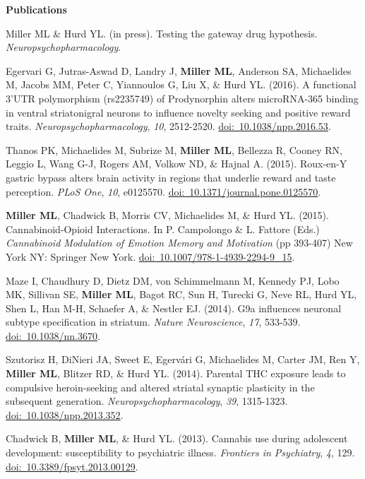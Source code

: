\documentclass[10pt, singleside]{article}
\begin{document}
{\large \textbf{Publications}}

\begin{description}
\item Miller ML \& Hurd YL. (in press). Testing the gateway drug hypothesis. \textit{Neuropsychopharmacology}.
\item Egervari G, Jutras-Aswad D, Landry J, \textbf{Miller ML}, Anderson SA, Michaelides M, Jacobs MM, Peter C, Yiannoulos G, Liu X, \& Hurd YL. (2016). A functional 3'UTR polymorphism (rs2235749) of Prodynorphin alters microRNA-365 binding in ventral striatonigral neurons to influence novelty seeking and positive reward traits. \textit{Neuropsychopharmacology}, \textit{10}, 2512-2520. \href{http://dx.doi.org/10.1038/npp.2016.53}{doi:~10.1038/npp.2016.53}.
\item Thanos PK, Michaelides M, Subrize M, \textbf{Miller ML}, Bellezza R, Cooney RN, Leggio L, Wang G-J, Rogers AM, Volkow ND, \& Hajnal A. (2015). Roux-en-Y gastric bypass alters brain activity in regions that underlie reward and taste perception. \textit{PLoS One}, \textit{10}, e0125570. \href{http://dx.doi.org/10.1371/journal.pone.0125570}{doi:~10.1371/journal.pone.0125570}.
\item \textbf{Miller ML}, Chadwick B, Morris CV, Michaelides M, \& Hurd YL. (2015). Cannabinoid-Opioid Interactions. In P. Campolongo \& L. Fattore (Eds.) \textit{Cannabinoid Modulation of Emotion Memory and Motivation} (pp 393-407) New York NY: Springer New York. \href{http://dx.doi.org/10.1007/978-1-4939-2294-9_15}{doi:~10.1007/978-1-4939-2294-9\_15}.
\item Maze I, Chaudhury D, Dietz DM, von Schimmelmann M, Kennedy PJ, Lobo MK, Sillivan SE, \textbf{Miller ML}, Bagot RC, Sun H, Turecki G, Neve RL, Hurd YL, Shen L, Han M-H, Schaefer A, \& Nestler EJ. (2014). G9a influences neuronal subtype specification in striatum. \textit{Nature Neuroscience}, \textit{17}, 533-539. \href{http://dx.doi.org/10.1038/nn.3670}{doi:~10.1038/nn.3670}.
\item Szutorisz H, DiNieri JA, Sweet E, Egervári G, Michaelides M, Carter JM, Ren Y, \textbf{Miller ML}, Blitzer RD, \& Hurd YL. (2014). Parental THC exposure leads to compulsive heroin-seeking and altered striatal synaptic plasticity in the subsequent generation. \textit{Neuropsychopharmacology}, \textit{39}, 1315-1323. \href{http://dx.doi.org/10.1038/npp.2013.352}{doi:~10.1038/npp.2013.352}.
\item Chadwick B, \textbf{Miller ML}, \& Hurd YL. (2013). Cannabis use during adolescent development: susceptibility to psychiatric illness. \textit{Frontiers in Psychiatry}, \textit{4}, 129. \href{http://dx.doi.org/10.3389/fpsyt.2013.00129}{doi:~10.3389/fpsyt.2013.00129}.

\end{description}
\end{document}
